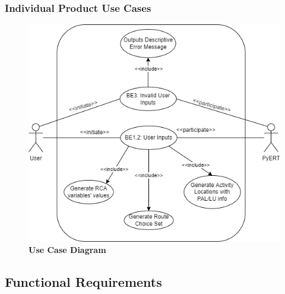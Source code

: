 \documentclass[12pt, titlepage]{article}
\begin{document}
\subsubsection{Individual Product Use Cases}
\begin{figure}[!htbp]
    \centering
    \includegraphics[scale=0.75]{Use_Case_Diagram.png}
    \caption{\bf Use Case Diagram}
\end{figure}

\subsection{Functional Requirements}
\end{document}
